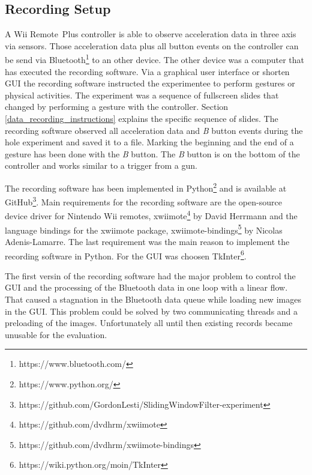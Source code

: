 \subsection{Recording Setup} \label{recording_setup}
A Wii Remote\texttrademark~Plus controller is able to observe acceleration data in three axis via sensors. Those
acceleration data plus all button events on the controller can be send via
Bluetooth\footnote{https://www.bluetooth.com/} to an other device. The other device was a computer that has executed the
recording software. Via a graphical user interface or shorten GUI the recording software instructed the experimentee to
perform gestures or physical activities. The experiment was a sequence of fullscreen slides that changed by performing a
gesture with the controller. Section \ref{data_recording_instructions} explains the specific sequence of slides. The
recording software observed all acceleration data and \textit{B} button events during the hole experiment and saved it
to a file. Marking the beginning and the end of a gesture has been done with the \textit{B} button. The \textit{B}
button is on the bottom of the controller and works similar to a trigger from a gun.

The recording software has been implemented in Python\footnote{https://www.python.org/} and is available at
GitHub\footnote{https://github.com/GordonLesti/SlidingWindowFilter-experiment}. Main requirements for the recording
software are the open-source device driver for Nintendo Wii remotes,
xwiimote\footnote{https://github.com/dvdhrm/xwiimote} by David Herrmann and the language bindings for the xwiimote
package, xwiimote-bindings\footnote{https://github.com/dvdhrm/xwiimote-bindings} by Nicolas Adenis-Lamarre. The last
requirement was the main reason to implement the recording software in Python. For the GUI was choosen
TkInter\footnote{https://wiki.python.org/moin/TkInter}.

The first versin of the recording software had the major problem to control the GUI and the
processing of the Bluetooth data in one loop with a linear flow. That caused a stagnation in the Bluetooth data queue
while loading new images in the GUI. This problem could be solved by two communicating threads and a preloading of the
images. Unfortunately all until then existing records became unusable for the evaluation.


